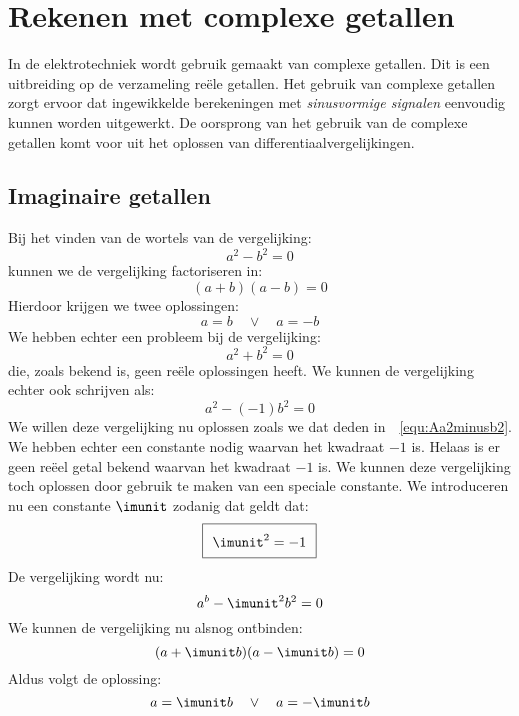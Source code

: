 

\chapter{Rekenen met complexe getallen}
\label{cha:complex}
In de elektrotechniek wordt gebruik gemaakt van complexe getallen. Dit is een uitbreiding op de verzameling reële getallen. Het gebruik van complexe getallen zorgt ervoor dat ingewikkelde berekeningen met \textsl{sinusvormige signalen} eenvoudig kunnen worden uitgewerkt. De oorsprong van het gebruik van de complexe getallen komt voor uit het oplossen van differentiaalvergelijkingen.

\section{Imaginaire getallen}

Bij het vinden van de wortels van de vergelijking:
%
\begin{equation}
\label{equ:Aa2minusb2}
a^2 - b^2 = 0
\end{equation}
%
kunnen we de vergelijking factoriseren in:
%
\begin{equation}
(a+b)(a-b) = 0
\end{equation}
%
Hierdoor krijgen we twee oplossingen:
%
\begin{equation}
a=b \quad \vee\quad a=-b
\end{equation}
%
We hebben echter een probleem bij de vergelijking:
%
\begin{equation}
a^2 + b^2 = 0
\end{equation}
%
die, zoals bekend is, geen reële oplossingen heeft.
We kunnen de vergelijking echter ook schrijven als:
%
\begin{equation}
a^2 - (-1)b^2 = 0
\end{equation}
%
We willen deze vergelijking nu oplossen zoals we dat deden in~~\ref{equ:Aa2minusb2}. We hebben echter een constante nodig waarvan het kwadraat $-1$ is. Helaas is er geen reëel getal bekend waarvan het kwadraat $-1$ is.
We kunnen deze vergelijking toch oplossen door gebruik te maken van een speciale constante. We introduceren nu een constante $\imunit$ zodanig dat geldt dat:
%
\begin{equation}\fboxsep=7pt
\boxed{\imunit^2 = -1}
\end{equation}
%
De vergelijking wordt nu:
%
\begin{equation}
a^b - \imunit^2b^2 = 0
\end{equation}
%
We kunnen de vergelijking nu alsnog ontbinden:
%
\begin{equation}
(a+\imunit b)(a-\imunit b) = 0
\end{equation}
%
Aldus volgt de oplossing:
%
\begin{equation}
a = \imunit b \quad\vee\quad a = -\imunit b
\end{equation}

